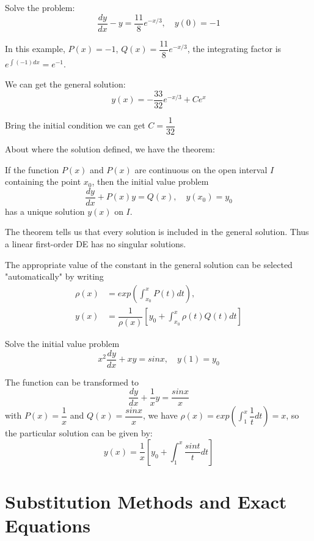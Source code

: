 \begin{example}
    Solve the problem:
    \[
        \dfrac{dy}{dx} - y = \dfrac{11}{8} e^{-x/3}, \quad y(0) = -1
    \]

    In this example, \(P(x) = -1\), \(Q(x) = \dfrac{11}{8}e^{-x/3}\), the integrating factor is \(e^{\int (-1) dx} = e^{-1}\). 

    We can get the general solution:
    \[
        y(x) = -\dfrac{33}{32}e^{-x/3} + Ce^x
    \]

    Bring the initial condition we can get \(C = \dfrac{1}{32}\) 
\end{example}

About where the solution defined, we have the theorem:
\begin{theorem}
    If the function \(P(x)\) and \(P(x)\) are continuous on the open interval \(I\) containing the point \(x_0\), then the initial value problem
    \[
        \dfrac{dy}{dx} + P(x)y = Q(x), \quad y(x_0) = y_0
    \]   
    has a unique solution \(y(x)\) on \(I\).
\end{theorem}
\begin{remark}
    The theorem tells us that every solution is included in the general solution. Thus a linear first-order DE has no singular solutions.
\end{remark}
\begin{remark}
    The appropriate value of the constant in the general solution can be selected "automatically" by writing
    \begin{align*}
        \rho(x) &= exp(\int_{x_0}^x P(t) dt),\\
        y(x) &= \dfrac{1}{\rho(x)} [y_0 + \int_{x_0}^x \rho(t) Q(t) dt]
    \end{align*}
\end{remark}


\begin{example}
    Solve the initial value problem
    \[
        x^2 \dfrac{dy}{dx} + xy= sin x, \quad y(1) = y_0
    \] 

    The function can be transformed to
    \[
        \dfrac{dy}{dx} + \dfrac{1}{x}y = \dfrac{sin x}{x}
    \]
    with \(P(x) = \dfrac{1}{x}\) and \(Q(x) = \dfrac{sin x}{x}\), we have \(\rho(x) = exp(\int_1^x \dfrac{1}{t}dt) = x\),
    so the particular solution can be given by:
    \[
        y(x) = \dfrac{1}{x} [y_0 + \int_1^x \dfrac{sin t}{t}dt]
    \]
\end{example}

\section{Substitution Methods and Exact Equations}


